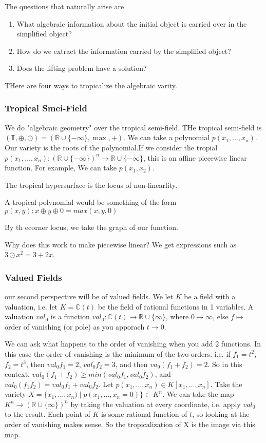 \documentclass[11pt]{article}
\theoremstyle{definition}
\theoremstyle{plain}%
\theoremstyle{definition}
\def\RR{{\mathbb R}}
\def\CC{{\mathbb C}}
\begin{document}
The questions that naturally arise are
\begin{enumerate}
    \item What algebraic information about the initial object is carried over in the simplified object?
    \item How do we extract the information carried by the simplified object?
    \item Does the lifting problem have a solution?
\end{enumerate}


THere are four ways to tropicalize the algebraic varity.

\subsubsection{Tropical Smei-Field}
We do "algebraic geometry" over the tropical semi-field. THe tropical semi-field is $(\mathbb{T}, \oplus, \odot ) = ( \RR \cup \{- \infty\}, \max, + )$. We can take a polynomial $p(x_1, \dots, x_n)$. Our variety is the roots of the polynomial.If we consider the tropial $p(x_1, \dots, x_n) : (\RR \cup \{- \infty\})^n \rightarrow \RR \cup \{- \infty\}$, this is an affine piecewise linear function. For example, We can take $p(x_1, x_2)$.



The tropical hypersurface is the locus of non-linearlity.

A tropical polynomial would be something of the form $p(x,y) : x \oplus y \oplus 0= max(x,y,0)$


By th ecorner locus, we take the graph of our function.





Why does this work to make piecewise linear? We get expressions such as $3 \odot x^2 = 3 + 2x$.


\subsubsection{Valued Fields}

our second perspective will be of valued fields. We let $K$ be a field with a valuation, i.e. let $K= \CC(t)$ be the field of rational functions in 1 variables. A valuation $val_0$ is a function $val_0: \CC(t) \rightarrow \RR \cup \{ \infty\}$, where $0 \mapsto \infty$, else $f \mapsto$ order of vanishing (or pole) as you apporach $t \rightarrow 0$.


We can ask what happens to the order of vanishing when you add 2 functions. In this case the order of vanishing is the minimum of the two orders. i.e. if $f_1=t^2$, $f_2=t^3$, then $val_0 f_1 = 2$, $val_0 f_2 = 3$, and then $va_0(f_1+f_2)=2$.  So in this context, $val_0(f_1+f_2) \geq min(val_0 f_1, val_0f_2)$, and $val_0(f_1f_2) = val_0 f_1 + val_0 f_2$. Let $p(x_1, \dots, x_n) \in K[x_1, \dots, x_n]$. Take the variety $X = \{x_1, \dots, x_n) \; |\; p(x_1, \dots, x_n=0) \} \subset K^n$. We can take the map $K^n \rightarrow (\RR \cup \{ \infty\})^n$ by taking the valuation at every coordinate, i.e. apply  $val_{0}$ to the result. Each point of $K$ is some rational function of $t$, so looking at the order of vanishing makes sense. So the tropicalization of X is the image via this map.
\end{document}
